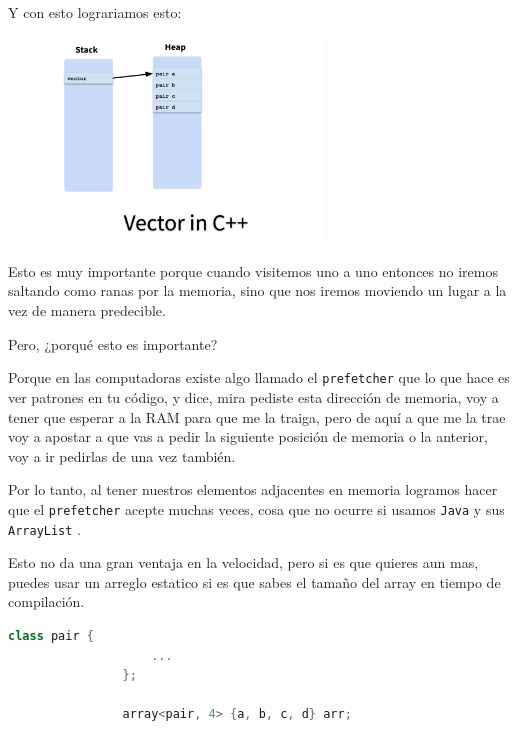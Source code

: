 \documentclass[12pt, fleqn]{report}                             %
\theoremstyle{break}                                            %
\newcommand{\textCode}[1]  { \texttt{#1} }                      %
\begin{document}
            Y con esto lograriamos esto:
            \begin{figure}[h]
                \includegraphics[width=0.65\textwidth]{VectorCpp}
            \end{figure}

            Esto es muy importante porque cuando visitemos uno a uno entonces no iremos saltando como ranas
            por la memoria, sino que nos iremos moviendo un lugar a la vez de manera predecible.

            Pero, ¿porqué esto es importante?

            Porque en las computadoras existe algo llamado el \textCode{prefetcher} que lo que hace es ver
            patrones en tu código, y dice, mira pediste esta dirección de memoria, voy a tener que esperar
            a la RAM para que me la traiga, pero de aquí a que me la trae voy a apostar a que vas a pedir
            la siguiente posición de memoria o la anterior, voy a ir pedirlas de una vez también.

            Por lo tanto, al tener nuestros elementos adjacentes en memoria logramos hacer que el 
            \textCode{prefetcher} acepte muchas veces, cosa que no ocurre si usamos \textCode{Java} y sus 
            \textCode{ArrayList}.

            Esto no da una gran ventaja en la velocidad, pero si es que quieres aun mas, puedes usar un arreglo
            estatico si es que sabes el tamaño del array en tiempo de compilación.

            \begin{lstlisting}[language=C++, gobble=16]
                class pair {
                    ...
                };

                array<pair, 4> {a, b, c, d} arr; 
            \end{lstlisting}
\end{document}
